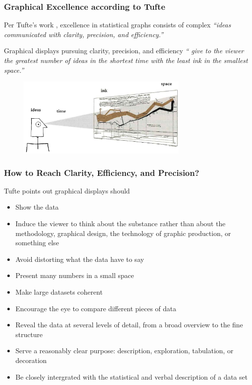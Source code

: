 \documentclass[aspectratio=1610]{beamer}
\begin{document}
\begin{frame}
	\frametitle{Graphical Excellence according to Tufte}
	Per Tufte's work \cite{tufte2001}, excellence in statistical graphs consists of complex
	\emph{``ideas communicated with clarity, precision, and
		efficiency.''}

	\vspace{1em}

	Graphical displays pursuing clarity, precision, and efficiency \emph{``
		give to the viewer the greatest number of ideas
		in the shortest time with the least ink in the smallest space.''}

	\begin{figure}
		\begin{small}
			\begin{center}
				\includegraphics[width=0.75\textwidth]{
					images/graphical_excellence.png
				}
			\end{center}
		\end{small}
	\end{figure}

\end{frame}

\begin{frame}
	\frametitle{How to Reach Clarity, Efficiency, and Precision?}
	Tufte points out graphical displays should
	\begin{itemize}
		\item
		      Show the data
		\item
		      Induce the viewer to think about the substance rather than
		      about the methodology, graphical design, the technology of
		      graphic production, or something else
		\item
		      Avoid distorting what the data have to say
		\item
		      Present many numbers in a small space
		\item
		      Make large datasets coherent
		\item
		      Encourage the eye to compare different pieces of data
		\item
		      Reveal the data at several levels of detail, from a broad
		      overview to the fine structure
		\item
		      Serve a reasonably clear purpose: description,
		      exploration, tabulation, or decoration
		\item
		      Be closely intergrated with the statistical and verbal
		      description of a data set
	\end{itemize}
\end{frame}
\end{document}
